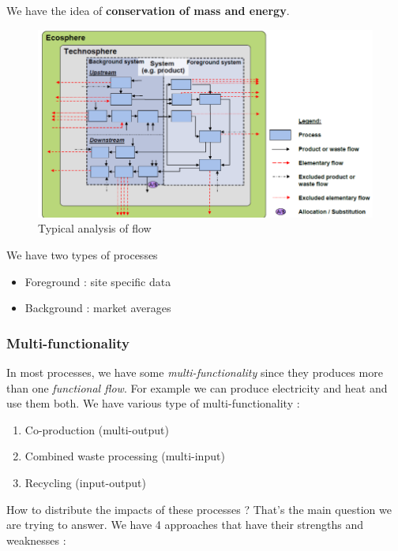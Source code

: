 We have the idea of \textbf{conservation of mass and energy}.

\begin{figure}
\centering
\includegraphics{image-2.png}
\caption{Typical analysis of flow}
\end{figure}

We have two types of processes

\begin{itemize}
\tightlist
\item
  Foreground : site specific data
\item
  Background : market averages
\end{itemize}

\hypertarget{multi-functionality}{%
\subsubsection{Multi-functionality}\label{multi-functionality}}

In most processes, we have some \emph{multi-functionality} since they
produces more than one \emph{functional flow}. For example we can
produce electricity and heat and use them both. We have various type of
multi-functionality :

\begin{enumerate}
\def\labelenumi{\arabic{enumi}.}
\tightlist
\item
  Co-production (multi-output)
\item
  Combined waste processing (multi-input)
\item
  Recycling (input-output)
\end{enumerate}

How to distribute the impacts of these processes ? That's the main
question we are trying to answer. We have 4 approaches that have their
strengths and weaknesses :

